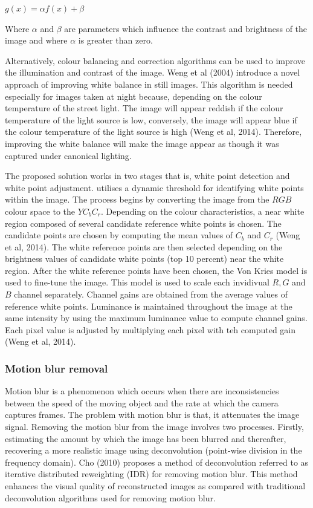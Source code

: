 \documentclass[a4paper, 12pt]{article}
\begin{document}
\begin{center}
 $g(x) = \alpha f(x) + \beta$
\end{center}

Where $\alpha$ and $\beta$ are parameters which influence the contrast and brightness of the image and where $\alpha$ is greater than zero. 

Alternatively, colour balancing and correction algorithms can be used to improve the illumination and contrast of the image. Weng et al (2004) introduce a novel approach of improving white balance in still images. This algorithm is needed especially for images taken at night because, depending on the colour temperature of the street light. The image will appear reddish if the colour temperature of the light source is low, conversely, the image will appear blue if the colour temperature of the light source is high (Weng et al, 2014). Therefore, improving the white balance will make the image appear as though it was captured under canonical lighting. 
\parskip 0.2in

The proposed solution works in two stages that is, white point detection and white point adjustment. utilises a dynamic threshold for identifying white points within the image. The process begins by converting the image from the $RGB$ colour space to the  $YC_{b}C_{r}$. Depending on the colour characteristics, a near white region composed of several candidate reference white points is chosen. The candidate points are chosen by computing the mean values of $C_{b}$ and $C_{r}$ (Weng et al, 2014). The white reference points are then selected depending on the brightness values  of candidate white points (top 10 percent) near the white region. After the white reference points have been chosen, the Von Kries model is used to fine-tune the image. This model is used to scale each invidivual $R, G$ and $B$ channel separately. Channel gains are obtained from the average values of reference white points. Luminance is maintained throughout the image at the same intensity by using the maximum luminance value to compute channel gains. Each pixel value is adjusted by multiplying each pixel with teh computed gain (Weng et al, 2014). 

\subsubsection{ Motion blur removal}

Motion blur is a phenomenon which occurs when there are inconsistencies between the speed of the moving object and the rate at which the camera captures frames. The problem with motion blur is that, it attenuates the image signal. Removing the motion blur from the image involves two processes. Firstly, estimating the amount by which the image has been blurred and thereafter, recovering a more realistic image using  deconvolution (point-wise division in the frequency domain). Cho (2010) proposes a method of deconvolution referred to as iterative distributed reweighting (IDR) for removing motion blur. This method enhances the visual quality of reconstructed images as compared with traditional deconvolution algorithms used for removing motion blur.
\parskip 0.2in 
\end{document}
